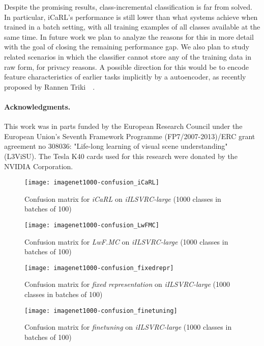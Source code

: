 \documentclass[10pt,twocolumn,letterpaper]{article}
\begin{document}
Despite the promising results, class-incremental classification is 
far from solved. In particular, iCaRL's performance is still lower 
than what systems achieve when trained in a batch setting, \ie with 
all training examples of all classes available at the same time. 
In future work we plan to analyze the reasons for this in more 
detail with the goal of closing the remaining performance gap.
We also plan to study related scenarios in which the classifier 
cannot store any of the training data in raw form, \eg for privacy 
reasons.
A possible direction for this would be to encode feature 
characteristics of earlier tasks implicitly by a autoencoder, 
as recently proposed by Rannen Triki~\etal~\cite{rannen2017b}.


\paragraph{Acknowledgments.} 
This work was in parts funded by the European Research Council 
under the European Union's Seventh Framework Programme (FP7/2007-2013)/ERC 
grant agreement no 308036: "Life-long learning of visual scene understanding" 
(L3ViSU). 
The Tesla K40 cards used for this research were donated by the NVIDIA Corporation.


{\small


}

\appendix 

\begin{figure*}\centering
\texttt{[image: imagenet1000-confusion\_iCaRL]}
\caption{Confusion matrix for \emph{iCaRL} on \emph{iILSVRC-large} (1000 classes in batches of 100)}
\label{fig:ILSVRC-confusion1}
\end{figure*}

\begin{figure*}\centering
\texttt{[image: imagenet1000-confusion\_LwFMC]}
\caption{Confusion matrix for \emph{LwF.MC} on \emph{iILSVRC-large} (1000 classes in batches of 100)}
\label{fig:ILSVRC-confusion2}
\end{figure*}

\begin{figure*}\centering
\texttt{[image: imagenet1000-confusion\_fixedrepr]}
\caption{Confusion matrix for \emph{fixed representation} on \emph{iILSVRC-large} (1000 classes in batches of 100)}
\label{fig:ILSVRC-confusion3}
\end{figure*}

\begin{figure*}\centering
\texttt{[image: imagenet1000-confusion\_finetuning]}
\caption{Confusion matrix for \emph{finetuning} on \emph{iILSVRC-large} (1000 classes in batches of 100)}
\label{fig:ILSVRC-confusion4}
\end{figure*}
\end{document}
